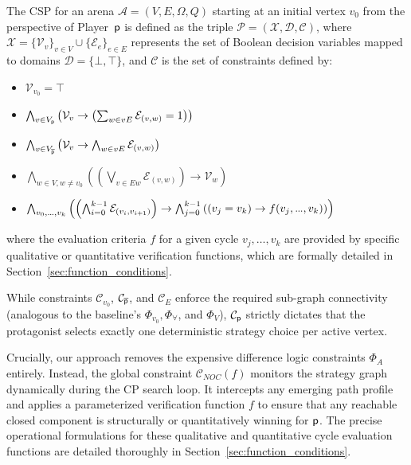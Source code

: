 \documentclass[preprint,12pt,authoryear]{elsarticle}
\begin{document}
\begin{definition}\label{def:csp}
The CSP for an arena $\mathcal{A} = (V, E, \Omega, Q)$ starting at an initial vertex $v_0$ from the perspective of Player~$\mathsf{p}$ is defined as the triple $\mathcal{P} = (\mathcal{X}, \mathcal{D}, \mathcal{C})$, where $\mathcal{X} = \{ \mathcal{V}_v \}_{v \in V} \cup \{ \mathcal{E}_e \}_{e \in E}$ represents the set of Boolean decision variables mapped to domains $\mathcal{D} = \{\bot, \top\}$, and $\mathcal{C}$ is the set of constraints defined by:
\begin{itemize}
    [leftmargin=2.3cm, labelwidth=2.8cm, align=right, itemsep=1.0ex, parsep=0pt]
    \item [$\mathcal{C}_{v_0}$ :] $\mathcal{V}_{v_0} = \top$
    \item [$\mathcal{C}_{\player}$ :] $\bigwedge_{v \in V_{\mathsf{p}}} \left(\mathcal{V}_v \rightarrow \left(\sum_{w \in vE} \mathcal{E}_{(v,w)}= 1\right)\right)$
    \item [$\mathcal{C}_{\opponent}$ :] $\bigwedge_{v \in V_{\overline{\mathsf{p}}}} \left(\mathcal{V}_v \rightarrow \bigwedge_{w \in vE} \mathcal{E}_{(v,w)}\right)$
    \item [$\mathcal{C}_{\!E}$ :] $\bigwedge_{w \in V, w \neq v_0} \left(\left(\bigvee_{v \in Ew} \mathcal{E}_{(v,w)}\right) \rightarrow \mathcal{V}_w\right)$
    \item [$\mathcal{C}_{\!N\!O\!C}(f)$ :] $\bigwedge_{v_0, .\kern-0.05em.\kern-0.05em., v_k} \left( \left(\bigwedge_{i=0}^{k-1} \mathcal{E}_{(v_i,v_{i+1})}\right) \to \bigwedge_{j=0}^{k-1} \left((v_j = v_k) \to f(v_j, .\kern-0.05em.\kern-0.05em., v_k)\right) \right)$
\end{itemize}
where the evaluation criteria $f$ for a given cycle $v_j, \dots, v_k$ are provided by specific qualitative or quantitative verification functions, which are formally detailed in Section~\ref{sec:function_conditions}.
\end{definition}

While constraints $\mathcal{C}_{v_0}$, $\mathcal{C}_{\opponent}$, and $\mathcal{C}_{\!E}$ enforce the required sub-graph connectivity (analogous to the baseline's $\Phi_{v_0}, \Phi_\forall$, and $\Phi_V$), $\mathcal{C}_{\player}$ strictly dictates that the protagonist selects exactly one deterministic strategy choice per active vertex. 

Crucially, our approach removes the expensive difference logic constraints $\Phi_A$ entirely. Instead, the global constraint $\mathcal{C}_{\!N\!O\!C}(f)$ monitors the strategy graph dynamically during the CP search loop. It intercepts any emerging path profile and applies a parameterized verification function $f$ to ensure that any reachable closed component is structurally or quantitatively winning for $\mathsf{p}$. The precise operational formulations for these qualitative and quantitative cycle evaluation functions are detailed thoroughly in Section~\ref{sec:function_conditions}.
\end{document}

